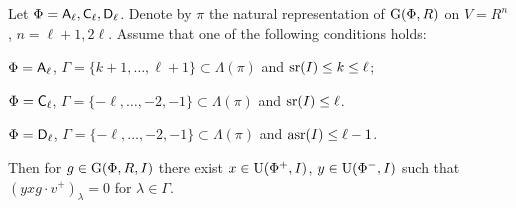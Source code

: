 \begin{lemma} \label{lemma:uraction} 
Let $\Phi=\mathsf{A}_\ell, \mathsf{C}_\ell, \mathsf{D}_\ell$. Denote by $\pi$ the natural representation of $\operatorname{G}(\Phi, R)$ on $V=R^n$, $n=\ell+1,2\ell$.
Assume that one of the following conditions holds:
\begin{lemlist}
 \item \label{item:uractionA} $\Phi=\mathsf{A}_\ell$, $\Gamma=\{ k+1, \ldots, \ell+1\} \subset \Lambda(\pi)$ and $\operatorname{sr}(I)\leq k\leq \ell$;
 \item \label{item:uractionC} $\Phi=\mathsf{C}_\ell$, $\Gamma=\{-\ell,\ldots, -2, -1\} \subset \Lambda(\pi)$ and $\operatorname{sr}(I)\leq \ell$. 
 \item \label{item:uractionD} $\Phi=\mathsf{D}_\ell$, $\Gamma=\{-\ell,\ldots, -2, -1\} \subset \Lambda(\pi)$ and $\operatorname{asr}(I)\leq \ell-1$. 
\end{lemlist}
Then for $g\in \operatorname{G}(\Phi, R, I)$ there exist $x\in \operatorname{U}(\Phi^+, I)$, $y\in \operatorname{U}(\Phi^-, I)$ such that $(yxg \cdot v^+)_\lambda = 0$ for $\lambda\in \Gamma$.
\end{lemma}
